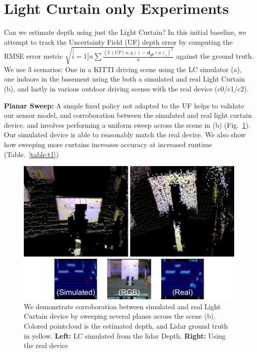 
\section{Light Curtain only Experiments}

Can we estimate depth using just the Light Curtain? In this initial baseline, we attempt to track the Uncertainty Field (UF) depth error by computing the RMSE error metric $\sqrt{\stackrel[i=1]{n}{\sum}\frac{\left(\mathbb{E}\left(UF\left(u,q\right)\right)-\mathbf{d_{gt}}(u)_{i}\right)^{2}}{n}}$ against the ground truth. We use 3 scenarios: One in a KITTI driving scene using the LC simulator (a), one indoors in the basement using the both a simulated and real Light Curtain (b), and lastly in various outdoor driving scenes with the real device (c0/c1/c2). 


\textbf{Planar Sweep:} A simple fixed policy not adapted to the UF helps to validate our sensor model, and corroboration between the simulated and real light curtain device. and  involves performing a uniform sweep across the scene in (b) (Fig.~\ref{fig:planarsweep}). Our simulated device is able to reasonably match the real device. We also show how sweeping more curtains increases accuracy at increased runtime (Table.~\ref{table:t1})
 
\begin{figure}
   \centering
   \begin{minipage}{0.4\textwidth}
       \centering
       \includegraphics[width=1.0\textwidth]{figures/sweep.png}
   \end{minipage}\hfill
   \centering
   \caption{We demonstrate corroboration between simulated and real Light Curtain device by sweeping several planes across the scene (b). Colored pointcloud is the estimated depth, and Lidar ground truth in yellow. \textbf{Left:} LC simulated from the lidar Depth. \textbf{Right:} Using the real device}
   \label{fig:planarsweep}
\end{figure}

